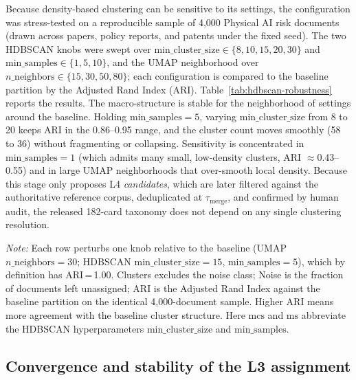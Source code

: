\documentclass[11pt]{article}
\newcommand{\fignote}[1]{\par\vspace{0.25em}\noindent\begin{minipage}{\linewidth}\footnotesize\textit{Note:} #1\end{minipage}}
\begin{document}
Because density-based clustering can be sensitive to its settings, the configuration was stress-tested on a reproducible sample of 4{,}000 Physical AI risk documents (drawn across papers, policy reports, and patents under the fixed seed). The two HDBSCAN knobs were swept over \(\mathrm{min\_cluster\_size}\in\{8,10,15,20,30\}\) and \(\mathrm{min\_samples}\in\{1,5,10\}\), and the UMAP neighborhood over \(n\_\mathrm{neighbors}\in\{15,30,50,80\}\); each configuration is compared to the baseline partition by the Adjusted Rand Index (ARI). Table~\ref{tab:hdbscan-robustness} reports the results. The macro-structure is stable for the neighborhood of settings around the baseline. Holding \(\mathrm{min\_samples}=5\), varying \(\mathrm{min\_cluster\_size}\) from 8 to 20 keeps ARI in the 0.86--0.95 range, and the cluster count moves smoothly (58 to 36) without fragmenting or collapsing. Sensitivity is concentrated in \(\mathrm{min\_samples}=1\) (which admits many small, low-density clusters, ARI \(\approx0.43\)--0.55) and in large UMAP neighborhoods that over-smooth local density. Because this stage only proposes L4 \emph{candidates}, which are later filtered against the authoritative reference corpus, deduplicated at \(\tau_{\mathrm{merge}}\), and confirmed by human audit, the released 182-card taxonomy does not depend on any single clustering resolution.

\begin{table}[htbp]
\centering
\footnotesize
\caption{HDBSCAN and UMAP hyperparameter robustness (4{,}000-document risk sample)}
\label{tab:hdbscan-robustness}

\vspace{0.25em}
\fignote{Each row perturbs one knob relative to the baseline (UMAP \(n\_\mathrm{neighbors}=30\); HDBSCAN \(\mathrm{min\_cluster\_size}=15\), \(\mathrm{min\_samples}=5\)), which by definition has ARI\,=\,1.00. Clusters excludes the noise class; Noise is the fraction of documents left unassigned; ARI is the Adjusted Rand Index against the baseline partition on the identical 4{,}000-document sample. Higher ARI means more agreement with the baseline cluster structure. Here \(\mathrm{mcs}\) and \(\mathrm{ms}\) abbreviate the HDBSCAN hyperparameters \(\mathrm{min\_cluster\_size}\) and \(\mathrm{min\_samples}\).}
\end{table}

\subsection*{Convergence and stability of the L3 assignment}
\end{document}
